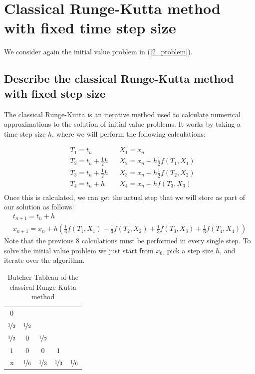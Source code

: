 \section{Classical Runge-Kutta method with fixed time step size} \label{part5}
We consider again the initial value problem in (\ref{2_problem}).

\subsection{Describe the classical Runge-Kutta method with fixed step size} \label{5_1}

The classical Runge-Kutta is an iterative method used to calculate numerical approximations to the solution of initial value problems. It works by taking a time step size $h$, where we will perform the following calculations:

\begin{align*}
    &T_1 = t_n &&X_1 = x_n \\
    &T_2 = t_n + \frac{1}{2}h  &&X_2 = x_n + h\frac{1}{2}f(T_1, X_1) \\
    &T_3 = t_n + \frac{1}{2}h  &&X_3 = x_n + h\frac{1}{2}f(T_2, X_2) \\
    &T_4 = t_n + h  &&X_4 = x_n + hf(T_3, X_3) \\
\end{align*}
Once this is calculated, we can get the actual step that we will store as part of our solution as follows:
\begin{gather*}
    t_{n+1} = t_n + h \\
    x_{n+1} = x_n + h\left(\frac{1}{6}f(T_1, X_1) + \frac{1}{3}f(T_2,X_2) + \frac{1}{3}f(T_3, X_3) + \frac{1}{6}f(T_4,X_4)\right)
\end{gather*}
Note that the previous 8 calculations must be performed in every single step. To solve the initial value problem we just start from $x_0$, pick a step size $h$, and iterate over the algorithm.

\begin{table}[H]
    \centering
    \begin{tabular}{c|cccc}
    0   &     &     &     &     \\
    $\nicefrac{1}{2}$ & $\nicefrac{1}{2}$ &     &     &     \\
    $\nicefrac{1}{2}$ & 0   & $\nicefrac{1}{2}$ &     &     \\
    $1$   & 0   & 0   & $1$   &     \\ \hline
    x   & $\nicefrac{1}{6}$ & $\nicefrac{1}{3}$ & $\nicefrac{1}{3}$ & $\nicefrac{1}{6}$
    \end{tabular}
    \caption{Butcher Tableau of the classical Runge-Kutta method}
    \label{5_BT_RK4}
\end{table}


